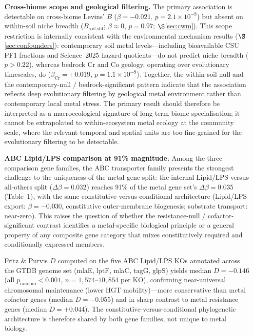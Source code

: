 \documentclass[times]{zHenriquesLab-StyleBioRxiv}
\begin{document}
\textbf{Cross-biome scope and geological filtering.}
The primary association is detectable on cross-biome Levins' $B$ ($\beta = -0.021$, $p = 2.1 \times 10^{-8}$) but absent on within-soil niche breadth ($B_\text{soil,std}$; $\beta \approx 0$, $p = 0.97$; $\S$\ref{sec:cwm}).
This scope restriction is internally consistent with the environmental mechanism results ($\S$\ref{sec:confounders}): contemporary soil metal levels---including bioavailable CSU PF1 fractions and Science~2025 hazard quotients---do not predict niche breadth ($p > 0.22$), whereas bedrock Cr and Co geology, operating over evolutionary timescales, do ($\beta_\text{Cr} = +0.019$, $p = 1.1 \times 10^{-9}$).
Together, the within-soil null and the contemporary-null / bedrock-significant pattern indicate that the association reflects deep evolutionary filtering by geological metal environment rather than contemporary local metal stress.
The primary result should therefore be interpreted as a macroecological signature of long-term biome specialisation; it cannot be extrapolated to within-ecosystem metal ecology at the community scale, where the relevant temporal and spatial units are too fine-grained for the evolutionary filtering to be detectable.

\textbf{ABC Lipid/LPS comparison at 91\% magnitude.}
Among the three comparison gene families, the ABC transporter family presents
the strongest challenge to the uniqueness of the metal-gene split: the internal
Lipid/LPS versus all-others split ($\Delta\beta = 0.032$) reaches 91\% of the
metal gene set's $\Delta\beta = 0.035$ (Table~1), with the same
constitutive-versus-conditional architecture (Lipid/LPS export: $\beta = -0.030$,
constitutive outer-membrane biogenesis; substrate transport: near-zero).
This raises the question of whether the resistance-null / cofactor-significant
contrast identifies a metal-specific biological principle or a general property
of any composite gene category that mixes constitutively required and conditionally
expressed members.

Fritz \& Purvis $D$ computed on the five ABC Lipid/LPS KOs annotated across the
GTDB genome set (mlaE, lptF, mlaC, tagG, glpS) yields median $D = -0.146$
(all $p_\text{random} < 0.001$, $n = 1{,}574$--$10{,}854$ per KO), confirming
near-universal chromosomal maintenance (lower HGT mobility)---more conservative than metal cofactor genes
(median $D = -0.055$) and in sharp contrast to metal resistance genes
(median $D = +0.044$). The constitutive-versus-conditional phylogenetic
architecture is therefore shared by both gene families, not unique to metal biology.
\end{document}
